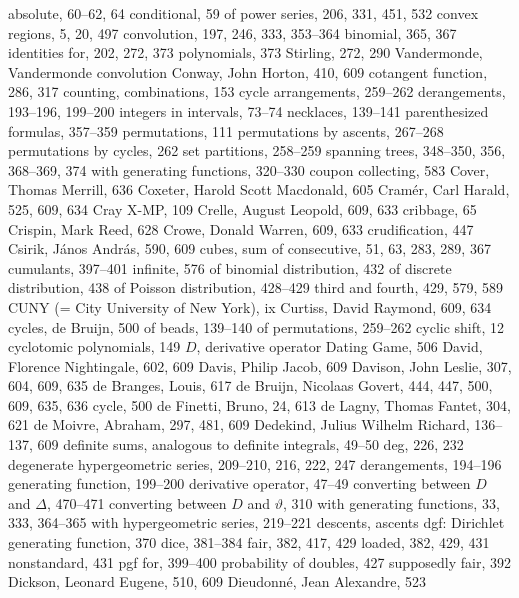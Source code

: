 \sub absolute, 60--62, 64
\sub conditional, 59
\sub of power series, 206, 331, 451, 532
convex regions, 5, 20, 497
convolution, 197, 246, 333, 353--364
\sub binomial, 365, 367
\sub identities for, 202, 272, 373
\sub polynomials, 373
\sub Stirling, 272, 290
\sub Vandermonde, \see Vandermonde convolution
Conway, John Horton, 410, 609
cotangent function, 286, 317
counting,
\sub combinations, 153
\sub cycle arrangements, 259--262
\sub derangements, 193--196, 199--200
\sub integers in intervals, 73--74
\sub necklaces, 139--141
\sub parenthesized formulas, 357--359
\sub permutations, 111
\sub permutations by ascents, 267--268
\sub permutations by cycles, 262
\sub set partitions, 258--259
\sub spanning trees, 348--350, 356, 368--369, 374
\sub with generating functions, 320--330
coupon collecting, 583
Cover, Thomas Merrill, 636
Coxeter, Harold Scott Macdonald, 605
Cram\'er, Carl Harald, 525, 609, 634
Cray X-MP, 109
Crelle, August Leopold, 609, 633
cribbage, 65
Crispin, Mark Reed, 628
Crowe, Donald Warren, 609, 633
crudification, 447
Csirik, J\'anos Andr\'as, 590, 609
cubes, sum of consecutive, 51, 63, 283, 289, 367
cumulants, 397--401
\sub infinite, 576
\sub of binomial distribution, 432
\sub of discrete distribution, 438
\sub of Poisson distribution, 428--429
\sub third and fourth, 429, 579, 589
CUNY (= City University of New York), ix
Curtiss, David Raymond, 609, 634
cycles,
\sub de Bruijn, 500
\sub of beads, 139--140
\sub of permutations, 259--262
cyclic shift, 12
cyclotomic polynomials, 149
\medskip
$D$, \see derivative operator
Dating Game, 506
David, Florence Nightingale, 602, 609
Davis, Philip Jacob, 609
Davison, John Leslie, 307, 604, 609, 635
de Branges, Louis, 617
de Bruijn, Nicolaas Govert, 444, 447, 500, 609, 635, 636
\sub cycle, 500
de Finetti, Bruno, 24, 613
de Lagny, Thomas Fantet, 304, 621
de Moivre, Abraham, 297, 481, 609
Dedekind, Julius Wilhelm Richard, 136--137, 609
definite sums, analogous to definite integrals, 49--50
deg, 226, 232
degenerate hypergeometric series, 209--210, 216, 222, 247
derangements, 194--196
\sub generating function, 199--200
derivative operator, 47--49
\sub converting between $D$ and $\Delta$, 470--471
\sub converting between $D$ and $\vartheta$, 310
\sub with generating functions, 33, 333, 364--365
\sub with hypergeometric series, 219--221
descents, \see ascents
dgf: Dirichlet generating function, 370
dice, 381--384
\sub fair, 382, 417, 429
\sub loaded, 382, 429, 431
\sub nonstandard, 431
\sub pgf for, 399--400
\sub probability of doubles, 427
\sub supposedly fair, 392
Dickson, Leonard Eugene, 510, 609
Dieudonn\'e, Jean Alexandre, 523
